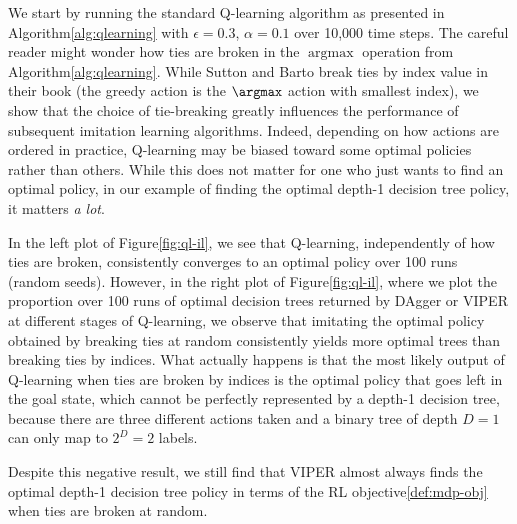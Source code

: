We start by running the standard Q-learning algorithm as presented in Algorithm\ref{alg:qlearning} with $\epsilon=0.3$, $\alpha=0.1$ over 10,000 time steps.
The careful reader might wonder how ties are broken in the $\operatorname{argmax}$ operation from Algorithm\ref{alg:qlearning}.
While Sutton and Barto break ties by index value in their book\cite{sutton} (the greedy action is the $\argmax$ action with smallest index), we show that the choice of tie-breaking greatly influences the performance of subsequent imitation learning algorithms.
Indeed, depending on how actions are ordered in practice, Q-learning may be biased toward some optimal policies rather than others.
While this does not matter for one who just wants to find an optimal policy, in our example of finding the optimal depth-1 decision tree policy, it matters \textit{a lot}.

In the left plot of Figure\ref{fig:ql-il}, we see that Q-learning, independently of how ties are broken, consistently converges to an optimal policy over 100 runs (random seeds).
However, in the right plot of Figure\ref{fig:ql-il}, where we plot the proportion over 100 runs of optimal decision trees returned by DAgger or VIPER at different stages of Q-learning, we observe that imitating the optimal policy obtained by breaking ties at random consistently yields more optimal trees than breaking ties by indices.
What actually happens is that the most likely output of Q-learning when ties are broken by indices is the optimal policy that goes left in the goal state,
which cannot be perfectly represented by a depth-1 decision tree, because there are three different actions taken and a binary tree of depth $D=1$ can only map to $2^D=2$ labels.

Despite this negative result, we still find that VIPER almost always finds the optimal depth-1 decision tree policy in terms of the RL objective\ref{def:mdp-obj} when ties are broken at random.

